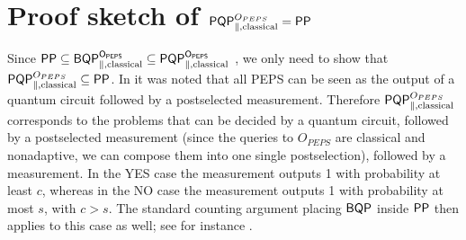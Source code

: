 \documentclass[11pt]{article}
\theoremstyle{definition}
\theoremstyle{remark}
\newcommand\PP{\sf{PP}}
\newcommand\BQP{{\sf{BQP}}}
\newcommand\PQP{{\sf{PQP}}}
\begin{document}
\section{Proof sketch of $\PQP^{O_{PEPS}}_{\parallel,\text{classical}} = \PP$} \label{app:peps}
Since $\PP \subseteq \BQP^{O_{PEPS}}_{\parallel,\text{classical}} \subseteq \PQP^{O_{PEPS}}_{\parallel,\text{classical}}$ \cite{swv07}, we only need to show that $\PQP^{O_{PEPS}}_{\parallel,\text{classical}} \subseteq \PP$. In \cite{swv07} it was noted that all PEPS can be seen as the output of a quantum circuit followed by a postselected measurement. Therefore $\PQP^{O_{PEPS}}_{\parallel,\text{classical}}$ corresponds to the problems that can be decided by a quantum circuit, followed by a postselected measurement (since the queries to $O_{PEPS}$ are classical and nonadaptive, we can compose them into one single postselection), followed by a measurement. In the YES case the measurement outputs 1 with probability at least $c$, whereas in the NO case the measurement outputs 1 with probability at most $s$, with $c > s$. The standard counting argument placing $\BQP$ inside $\PP$ then applies to this case as well; see for instance \cite[Propositions~2~and~3]{aaronson05}.
\end{document}
